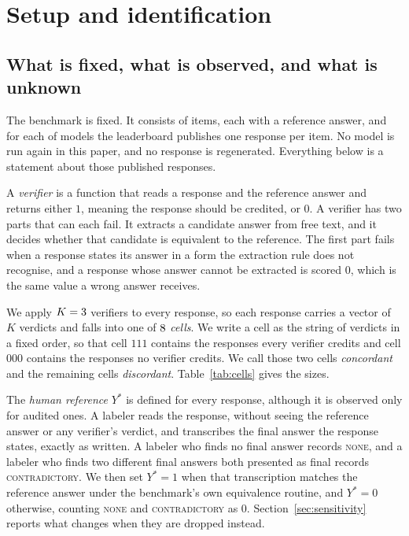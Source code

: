 
\section{Setup and identification}
\label{sec:setup}

\subsection{What is fixed, what is observed, and what is unknown}

The benchmark is fixed. It consists of \NumItems{} items, each with a reference answer, and
for each of \NumModels{} models the leaderboard publishes one response per item. No model is
run again in this paper, and no response is regenerated. Everything below is a statement about
those published responses.

A \emph{verifier} is a function that reads a response and the reference answer and returns
either $1$, meaning the response should be credited, or $0$. A verifier has two parts that
can each fail. It extracts a candidate answer from free text, and it decides whether that
candidate is equivalent to the reference. The first part fails when a response states its
answer in a form the extraction rule does not recognise, and a response whose answer cannot
be extracted is scored $0$, which is the same value a wrong answer receives.

We apply $K = 3$ verifiers to every response, so each response carries a vector of
$K$ verdicts and falls into one of $8$ \emph{cells}. We write a cell as the string of
verdicts in a fixed order, so that cell $111$ contains the responses every verifier credits
and cell $000$ contains the responses no verifier credits. We call those two cells
\emph{concordant} and the remaining cells \emph{discordant}. Table~\ref{tab:cells} gives the
sizes.

The \emph{human reference} $Y^*$ is defined for every response, although it is observed only
for audited ones. A labeler reads the response, without seeing the reference answer or any
verifier's verdict, and transcribes the final answer the response states, exactly as written.
A labeler who finds no final answer records \textsc{none}, and a labeler who finds two
different final answers both presented as final records \textsc{contradictory}. We then set
$Y^* = 1$ when that transcription matches the reference answer under the benchmark's own
equivalence routine, and $Y^* = 0$ otherwise, counting \textsc{none} and \textsc{contradictory}
as $0$. Section~\ref{sec:sensitivity} reports what changes when they are dropped instead.

